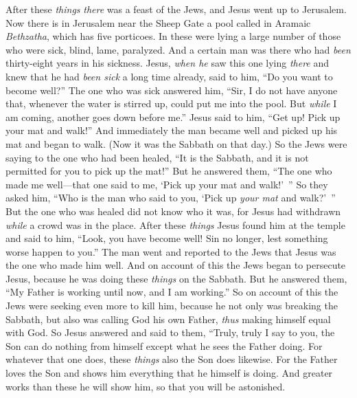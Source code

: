 \begin{biblechapter} %
 After these \textit{things} \textit{there} was a feast of the Jews, and Jesus went up to Jerusalem.
\verse Now there is in Jerusalem near the Sheep Gate a pool called in Aramaic \textit{Bethzatha}, which has five porticoes.
\verse In these were lying a large number of those who were sick, blind, lame, paralyzed.
\verse And a certain man was there who had \textit{been} thirty-eight years in his sickness.
\verse Jesus, \textit{when he} saw this one lying \textit{there} and knew that he had \textit{been sick} a long time already, said to him, “Do you want to become well?”
\verse The one who was sick answered him, “Sir, I do not have anyone that, whenever the water is stirred up, could put me into the pool. But \textit{while} I am coming, another goes down before me.”
\verse Jesus said to him, “Get up! Pick up your mat and walk!”
\verse And immediately the man became well and picked up his mat and began to walk. (Now it was the Sabbath on that day.)
\verse So the Jews were saying to the one who had been healed, “It is the Sabbath, and it is not permitted for you to pick up the mat!”
\verse But he answered them, “The one who made me well—that one said to me, ‘Pick up your mat and walk!’ ”
\verse So they asked him, “Who is the man who said to you, ‘Pick up \textit{your mat} and walk?’ ”
\verse But the one who was healed did not know who it was, for Jesus had withdrawn \textit{while} a crowd was in the place.
 After these \textit{things} Jesus found him at the temple and said to him, “Look, you have become well! Sin no longer, lest something worse happen to you.”
\verse The man went and reported to the Jews that Jesus was the one who made him well.
\verse And on account of this the Jews began to persecute Jesus, because he was doing these \textit{things} on the Sabbath.
\verse But he answered them, “My Father is working until now, and I am working.”
\verse So on account of this the Jews were seeking even more to kill him, because he not only was breaking the Sabbath, but also was calling God his own Father, \textit{thus} making himself equal with God.
 So Jesus answered and said to them, “Truly, truly I say to you, the Son can do nothing from himself except what he sees the Father doing. For whatever that one does, these \textit{things} also the Son does likewise.
\verse For the Father loves the Son and shows him everything that he himself is doing. And greater works than these he will show him, so that you will be astonished.

\end{biblechapter}
